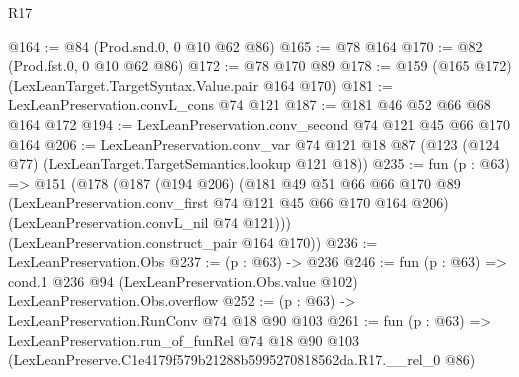 \begin{lexlean}{R17}
\begin{coremodule}
@164 := @84 (Prod.snd.{0, 0} @10 @62 @86)
@165 := @78 @164
@170 := @82 (Prod.fst.{0, 0} @10 @62 @86)
@172 := @78 @170 @89
@178 := @159 (@165 @172) (LexLeanTarget.TargetSyntax.Value.pair @164 @170)
@181 := LexLeanPreservation.convL_cons @74 @121
@187 := @181 @46 @52 @66 @68 @164 @172
@194 := LexLeanPreservation.conv_second @74 @121 @45 @66 @170 @164
@206 := LexLeanPreservation.conv_var
    @74
    @121
    @18
    @87
    (@123 (@124 @77) (LexLeanTarget.TargetSemantics.lookup @121 @18))
@235 := fun (p : @63) =>
  @151
    (@178
      (@187
        (@194 @206)
        (@181
          @49
          @51
          @66
          @66
          @170
          @89
          (LexLeanPreservation.conv_first @74 @121 @45 @66 @170 @164 @206)
          (LexLeanPreservation.convL_nil @74 @121)))
      (LexLeanPreservation.construct_pair @164 @170))
@236 := LexLeanPreservation.Obs
@237 := (p : @63) -> @236
@246 := fun (p : @63) =>
  cond.{1} @236 @94 (LexLeanPreservation.Obs.value @102) LexLeanPreservation.Obs.overflow
@252 := (p : @63) -> LexLeanPreservation.RunConv @74 @18 @90 @103
@261 := fun (p : @63) =>
  LexLeanPreservation.run_of_funRel
    @74
    @18
    @90
    @103
    (LexLeanPreserve.C1e4179f579b21288b5995270818562da.R17.__rel_0 @86)
\end{coremodule}
\end{lexlean}
